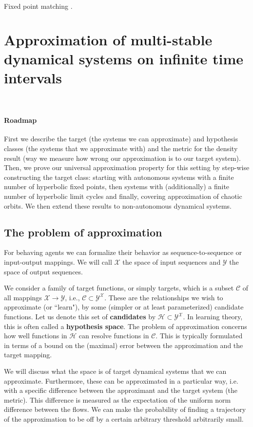 \documentclass{article}
\theoremstyle{definition}
\theoremstyle{remark}
\newcounter{ct}
\begin{document}
Fixed point matching \citep{cohen1992construction}.


\section{Approximation of multi-stable dynamical systems on infinite time intervals}\

\paragraph{Roadmap}
First we describe the target (the systems we can approximate) and hypothesis classes (the systems that we approximate with) and the metric for the density result (way we measure how wrong our approximation is to our target system).
Then, we prove our universal approximation property for this setting by step-wise constructing the target class:
starting with autonomous systems with a finite number of hyperbolic fixed points,
then systems with (additionally) a finite number of hyperbolic limit cycles
and finally, covering approximation of chaotic orbits.
We then extend these results to non-autonomous dynamical systems.



\subsection{The problem of approximation}\label{sec:approximationtheory} %
For behaving agents we can formalize their behavior as sequence-to-sequence or input-output mappings.
We will call $\mathcal{X}$ the space of input sequences and $\mathcal{Y}$ the space of output sequences.

We consider a family of target functions, or simply targets, which is a subset \(\mathcal{C} \) of all mappings \( \mathcal{X} \rightarrow \mathcal{Y} \), i.e., \( \mathcal{C} \subset \mathcal{Y}^\mathcal{X} \). 
These are the relationships we wish to approximate (or ``learn"), by some (simpler or at least parameterized) candidate functions.
Let us denote this set of \textbf{candidates} by \( \mathcal{H} \subset \mathcal{Y}^\mathcal{X} \).
In learning theory, this is often called a \textbf{hypothesis space}.
The problem of approximation concerns how well functions in \( \mathcal{H} \) can resolve functions in \( \mathcal{C} \).
This is typically formulated in terms of a bound on the (maximal) error between the approximation and the target mapping.

We will discuss what the space is of target dynamical systems that we can approximate.
Furthermore, these can be approximated in a particular way, i.e. with a specific difference between the approximant and the target system (the metric).
This difference is measured as the expectation of the uniform norm difference between the flows. 
We can make the probability of finding a trajectory of the approximation to be off by a certain arbitrary threshold arbitrarily small. 
\end{document}
